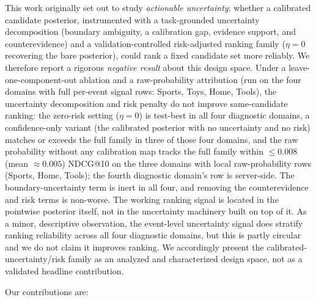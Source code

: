 This work originally set out to study \emph{actionable uncertainty}: whether a
calibrated candidate posterior, instrumented with a task-grounded uncertainty
decomposition (boundary ambiguity, a calibration gap, evidence support, and
counterevidence) and a validation-controlled risk-adjusted ranking family
($\eta=0$ recovering the bare posterior), could rank a fixed candidate set more
reliably. We therefore report a rigorous \emph{negative result} about this
design space. Under a leave-one-component-out ablation and a raw-probability
attribution (run on the four domains with full per-event signal rows: Sports,
Toys, Home, Tools), the uncertainty decomposition and risk penalty do not
improve same-candidate ranking: the zero-risk setting ($\eta=0$) is test-best in
all four diagnostic domains, a confidence-only variant (the calibrated posterior
with no uncertainty and no risk) matches or exceeds the full family in three of
those four domains, and the raw probability without any calibration map tracks
the full family within $\leq 0.008$ (mean $\approx 0.005$) NDCG@10 on the three
domains with local raw-probability rows (Sports, Home, Tools); the fourth
diagnostic domain's row is server-side. The boundary-uncertainty term is
inert in all four, and removing the counterevidence and risk terms is
non-worse. The working ranking signal is located in the pointwise posterior
itself, not in the uncertainty machinery built on top of it. As a minor,
descriptive observation, the event-level uncertainty signal does stratify
ranking reliability across all four diagnostic domains, but this is partly
circular and we do not claim it improves ranking. We accordingly present the
calibrated-uncertainty/risk family as an analyzed and characterized design
space, not as a validated headline contribution.

Our contributions are:

